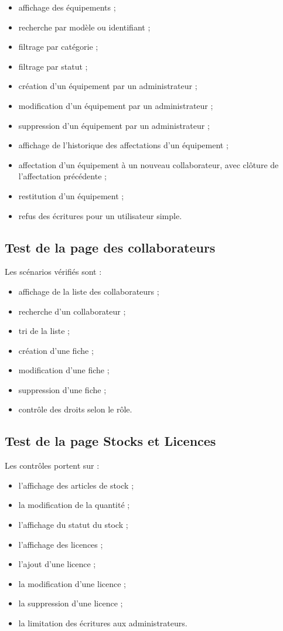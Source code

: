 \documentclass{rapportENSIAS}
\begin{document}
\begin{itemize}
    \item affichage des équipements ;
    \item recherche par modèle ou identifiant ;
    \item filtrage par catégorie ;
    \item filtrage par statut ;
    \item création d’un équipement par un administrateur ;
    \item modification d’un équipement par un administrateur ;
    \item suppression d’un équipement par un administrateur ;
    \item affichage de l’historique des affectations d’un équipement ;
    \item affectation d’un équipement à un nouveau collaborateur, avec clôture de l’affectation précédente ;
    \item restitution d’un équipement ;
    \item refus des écritures pour un utilisateur simple.
\end{itemize}

\subsection{Test de la page des collaborateurs}

Les scénarios vérifiés sont :

\begin{itemize}
    \item affichage de la liste des collaborateurs ;
    \item recherche d’un collaborateur ;
    \item tri de la liste ;
    \item création d’une fiche ;
    \item modification d’une fiche ;
    \item suppression d’une fiche ;
    \item contrôle des droits selon le rôle.
\end{itemize}

\subsection{Test de la page Stocks et Licences}

Les contrôles portent sur :

\begin{itemize}
    \item l’affichage des articles de stock ;
    \item la modification de la quantité ;
    \item l’affichage du statut du stock ;
    \item l’affichage des licences ;
    \item l’ajout d’une licence ;
    \item la modification d’une licence ;
    \item la suppression d’une licence ;
    \item la limitation des écritures aux administrateurs.
\end{itemize}
\end{document}
